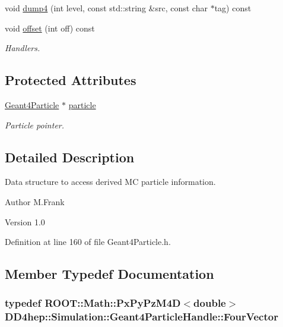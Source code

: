 \begin{DoxyCompactItemize}
void \hyperlink{class_d_d4hep_1_1_simulation_1_1_geant4_particle_handle_a41a398ac0a722fef6b3837bc559fb0e5}{dump4} (int level, const std::string \&src, const char $\ast$tag) const 
\item 
void \hyperlink{class_d_d4hep_1_1_simulation_1_1_geant4_particle_handle_a6eae2e14da760e078d339e54bd7f4312}{offset} (int off) const 
\begin{DoxyCompactList}\small\item\em Handlers. \item\end{DoxyCompactList}\end{DoxyCompactItemize}
\subsection*{Protected Attributes}
\begin{DoxyCompactItemize}
\item 
\hyperlink{class_d_d4hep_1_1_simulation_1_1_geant4_particle}{Geant4Particle} $\ast$ \hyperlink{class_d_d4hep_1_1_simulation_1_1_geant4_particle_handle_ad7a732832f8fe7f74c8fdb4cff5baced}{particle}
\begin{DoxyCompactList}\small\item\em Particle pointer. \item\end{DoxyCompactList}\end{DoxyCompactItemize}


\subsection{Detailed Description}
Data structure to access derived MC particle information. \begin{DoxyAuthor}{Author}
M.Frank 
\end{DoxyAuthor}
\begin{DoxyVersion}{Version}
1.0 
\end{DoxyVersion}


Definition at line 160 of file Geant4Particle.h.

\subsection{Member Typedef Documentation}
\hypertarget{class_d_d4hep_1_1_simulation_1_1_geant4_particle_handle_a79648f819b70d2f741fd1a5e19dc2f23}{
\subsubsection[{FourVector}]{\setlength{\rightskip}{0pt plus 5cm}typedef ROOT::Math::PxPyPzM4D$<$double$>$ {\bf DD4hep::Simulation::Geant4ParticleHandle::FourVector}}}
\label{class_d_d4hep_1_1_simulation_1_1_geant4_particle_handle_a79648f819b70d2f741fd1a5e19dc2f23}


